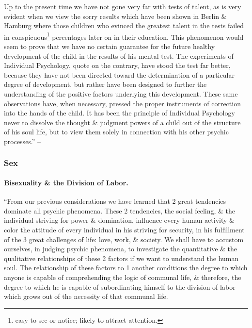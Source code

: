 \documentclass{article}
\begin{document}
Up to the present time we have not gone very far with tests of talent, as is very evident when we view the sorry results which have been shown in Berlin \& Hamburg where those children who evinced the greatest talent in the tests failed in conspicuous\footnote{easy to see or notice; likely to attract attention.} percentages later on in their education. This phenomenon would seem to prove that we have no certain guarantee for the future healthy development of the child in the results of his mental test. The experiments of Individual Psychology, quote on the contrary, have stood the test far better, because they have not been directed toward the determination of a particular degree of development, but rather have been designed to further the understanding of the positive factors underlying this development. These same observations have, when necessary, pressed the proper instruments of correction into the hands of the child. It has been the principle of Individual Psychology never to dissolve the thought \& judgment powers of a child out of the structure of his soul life, but to view them solely in connection with his other psychic processes.'' -- \cite[pp. 117--119]{Adler_human_nature}

\subsubsection{Sex}

\paragraph{Bisexuality \& the Division of Labor.} ``From our previous considerations we have learned that 2 great tendencies dominate all psychic phenomena. These 2 tendencies, the social feeling, \& the individual striving for power \& domination, influence every human activity \& color the attitude of every individual in his striving for security, in his fulfillment of the 3 great challenges of life: love, work, \& society. We shall have to accustom ourselves, in judging psychic phenomena, to investigate the quantitative \& the qualitative relationships of these 2 factors if we want to understand the human soul. The relationship of these factors to 1 another conditions the degree to which anyone is capable of comprehending the logic of communal life, \& therefore, the degree to which he is capable of subordinating himself to the division of labor which grows out of the necessity of that communal life.
\end{document}
